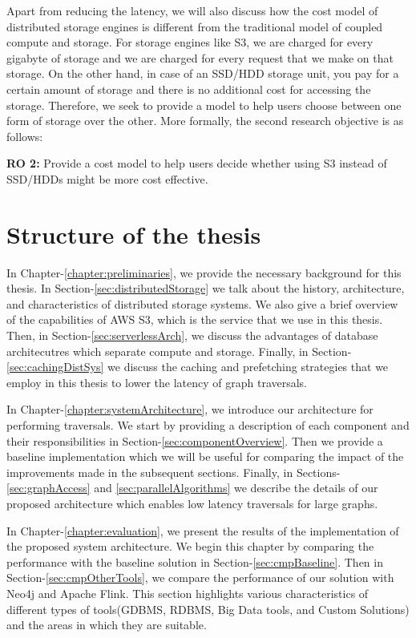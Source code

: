 \medskip
Apart from reducing the latency, we will also discuss how the cost model of
distributed storage engines is different from the traditional model of coupled
compute and storage. For storage engines like S3, we are charged for every
gigabyte of storage and we are charged for every request that we make on that
storage. On the other hand, in case of an SSD/HDD storage unit, you pay for a
certain amount of storage and there is no additional cost for accessing the
storage. Therefore, we seek to provide a model to help users choose between one
form of storage over the other. More formally, the second research objective is
as follows:
\begin{displayquote}
    \textbf{RO 2:} Provide a cost model to help users decide whether using S3
    instead of SSD/HDDs might be more cost effective.
\end{displayquote}


\section{Structure of the thesis}

\medskip
In Chapter-\ref{chapter:preliminaries}, we provide the necessary background for
this thesis. In Section-\ref{sec:distributedStorage} we talk about the
history, architecture, and characteristics of distributed storage systems. We
also give a brief overview of the capabilities of AWS S3, which is the service
that we use in this thesis. Then,
in Section-\ref{sec:serverlessArch}, we discuss the advantages of database
architecutres which separate compute and storage. Finally, in
Section-\ref{sec:cachingDistSys} we discuss the caching and prefetching
strategies that we employ in this thesis to lower the latency of graph
traversals.

\medskip
In Chapter-\ref{chapter:systemArchitecture}, we introduce our architecture for
performing traversals. We start by providing a description of each component and their
responsibilities in Section-\ref{sec:componentOverview}. 
Then we provide a baseline implementation which we will be useful for comparing
the impact of the improvements made in the subsequent sections. Finally, in
Sections-\ref{sec:graphAccess} and \ref{sec:parallelAlgorithms} 
we describe the details of our proposed architecture
which enables low latency traversals for large graphs.

\medskip
In Chapter-\ref{chapter:evaluation}, we present the results of the
implementation of the proposed system architecture. We begin this chapter by
comparing the performance with the baseline solution in
Section-\ref{sec:cmpBaseline}. Then in Section-\ref{sec:cmpOtherTools}, we
compare the performance of our solution with Neo4j and Apache Flink. This
section highlights various characteristics of different types of tools(GDBMS,
RDBMS, Big Data tools, and Custom Solutions) and the areas in which they 
are suitable. 

